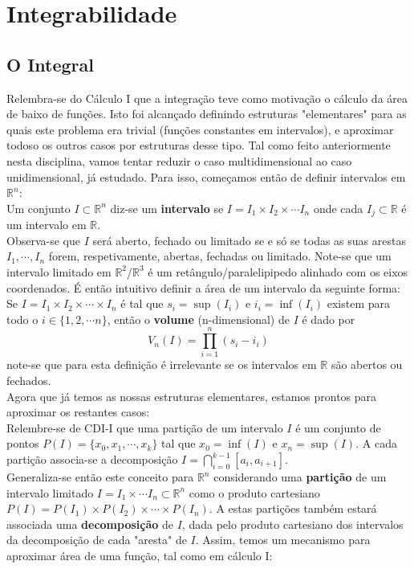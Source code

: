 \documentclass{article}
\newcommand{\R}{\mathbb{R}}
\begin{document}
\section{Integrabilidade}

\subsection{O Integral}
Relembra-se do Cálculo I que a integração teve como motivação o cálculo da área de baixo de funções. Isto foi alcançado definindo estruturas "elementares" para as quais este problema era trivial (funções constantes em intervalos), e aproximar todoso os outros casos por estruturas desse tipo. Tal como feito anteriormente nesta disciplina, vamos tentar reduzir o caso multidimensional ao caso unidimensional, já estudado. Para isso, começamos então de definir intervalos em $\R^n$:\\
Um conjunto $I \subset \R^n$ diz-se um \textbf{intervalo} se $I = I_1 \times I_2 \times \cdots I_n$ onde cada $I_j \subset \R$ é um intervalo em $\R$.\\
Observa-se que $I$ será aberto, fechado ou limitado se e só se todas as suas arestas $I_1, \cdots, I_n$ forem, respetivamente, abertas, fechadas ou limitado.
Note-se que um intervalo limitado em $\R^2$/$\R^3$ é um retângulo/paralelipipedo alinhado com os eixos coordenados. É então intuitivo definir a área de um intervalo da seguinte forma:\\
Se $I = I_1 \times I_2 \times \cdots \times I_n$ é tal que $s_i = \sup(I_i)$ e $i_i = \inf(I_i)$ existem para todo o $i \in \{1,2,\cdots n\}$, então o \textbf{volume} (n-dimensional) de $I$ é dado por
$$
V_n(I) = \prod_{i=1}^n (s_i-i_i)
$$
note-se que para esta definição é irrelevante se os intervalos em $\R$ são abertos ou fechados.\\
Agora que já temos as nossas estruturas elementares, estamos prontos para aproximar os restantes casos:\\
Relembre-se de CDI-I que uma partição de um intervalo $I$ é um conjunto de pontos $P(I) = \{ x_0, x_1, \cdots, x_k \}$ tal que $x_0 = \inf(I)$ e $x_n = \sup(I)$. A cada partição associa-se a decomposição $I = \bigcap_{i=0}^{k-1} [a_i, a_{i+1}]$.\\
Generaliza-se então este conceito para $\R^n$ considerando uma \textbf{partição} de um intervalo limitado $I = I_1 \times \cdots I_n \subset \R^n$ como o produto cartesiano $P(I) = P(I_1) \times P(I_2) \times \cdots \times P(I_n)$. A estas partições também estará associada uma \textbf{decomposição} de $I$, dada pelo produto cartesiano dos intervalos da decomposição de cada "aresta" de $I$. Assim, temos um mecanismo para aproximar área de uma função, tal como em cálculo I:\\
\end{document}
